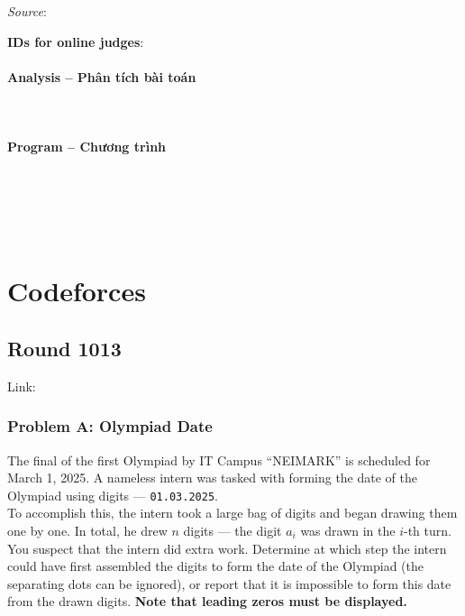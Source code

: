 \documentclass{article}
\begin{document}
\textit{Source}: 

\textbf{IDs for online judges}:

\paragraph{Analysis -- Phân tích bài toán} \mbox{} \\



\paragraph{Program -- Chương trình} \mbox{} \\


\begin{lstlisting}
	
	
\end{lstlisting}



\section{Codeforces}

\subsection{Round 1013}

Link: \url{}

\subsubsection{Problem A: Olympiad Date}

The final of the first Olympiad by IT Campus ``NEIMARK'' is scheduled for March 1, 2025. A nameless intern was tasked with forming the date of the Olympiad using digits — \texttt{01.03.2025}.\\

To accomplish this, the intern took a large bag of digits and began drawing them one by one. In total, he drew $n$ digits — the digit $a_i$ was drawn in the $i$-th turn.\\

You suspect that the intern did extra work. Determine at which step the intern could have first assembled the digits to form the date of the Olympiad (the separating dots can be ignored), or report that it is impossible to form this date from the drawn digits. \textbf{Note that leading zeros must be displayed.}
\end{document}
